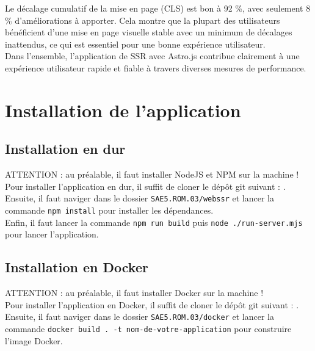 \documentclass[12pt, a4paper, oneside]{article}
\begin{document}
Le décalage cumulatif de la mise en page (CLS) est bon à 92 \%, avec seulement 8 \% d'améliorations à apporter. Cela montre que la plupart des utilisateurs bénéficient d'une mise en page visuelle stable avec un minimum de décalages inattendus, ce qui est essentiel pour une bonne expérience utilisateur.\\

Dans l'ensemble, l'application de SSR avec Astro.js contribue clairement à une expérience utilisateur rapide et fiable à travers diverses mesures de performance.


\newpage
\section{Installation de l'application}

\subsection{Installation en dur}

ATTENTION : au préalable, il faut installer NodeJS et NPM sur la machine !\\

Pour installer l'application en dur, il suffit de cloner le dépôt git suivant : \url{}{}.\\

Ensuite, il faut naviger dans le dossier \verb|SAE5.ROM.03/webssr| et lancer la commande \verb|npm install| pour installer les dépendances.\\
Enfin, il faut lancer la commande \verb|npm run build| puis \verb|node ./run-server.mjs| pour lancer l'application.\\

\subsection{Installation en Docker}

ATTENTION : au préalable, il faut installer Docker sur la machine !\\

Pour installer l'application en Docker, il suffit de cloner le dépôt git suivant : \url{}{}.\\

Ensuite, il faut naviger dans le dossier \verb|SAE5.ROM.03/docker| et lancer la commande \verb|docker build . -t nom-de-votre-application| pour construire l'image Docker.\\
\end{document}
